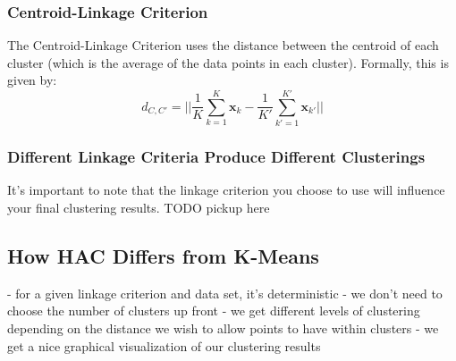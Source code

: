 \subsubsection{Centroid-Linkage Criterion}
The Centroid-Linkage Criterion uses the distance between the centroid of each cluster (which is the average of the data points in each cluster). Formally, this is given by:
\begin{equation} \label{cent-linkage-crit}
	d_{C, C'} = || \frac{1}{K} \sum_{k=1}^{K} \textbf{x}_{k} - \frac{1}{K'} \sum_{k'=1}^{K'} \textbf{x}_{k'} ||
\end{equation}

\subsubsection{Different Linkage Criteria Produce Different Clusterings}
It's important to note that the linkage criterion you choose to use will influence your final clustering results. TODO pickup here

\subsection{How HAC Differs from K-Means}
- for a given linkage criterion and data set, it's deterministic
- we don't need to choose the number of clusters up front
- we get different levels of clustering depending on the distance we wish to allow points to have within clusters
- we get a nice graphical visualization of our clustering results





